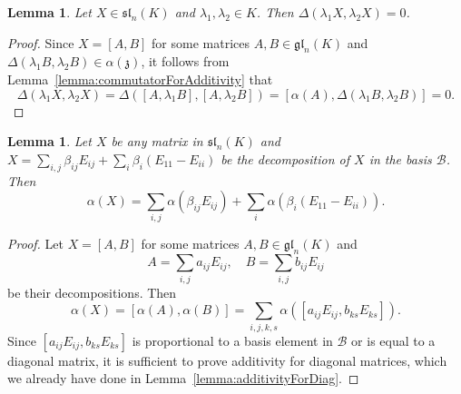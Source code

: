 \documentclass[a4paper,reqno,12pt]{amsart}
\newtheorem{lemma}[proposition]{Lemma}
\theoremstyle{definition}
\theoremstyle{remark}
\def\zzz{\mathfrak{z}}
\def\gl{\mathfrak{gl}}
\def\sl{\mathfrak{sl}}
\begin{document}
	\begin{lemma}\label{lemma:additivityForProportional}
		Let $X \in \sl_n(K)$ and $\lambda_1, \lambda_2 \in K$. Then $\Delta(\lambda_1 X, \lambda_2 X) = 0$.
	\end{lemma}

	\begin{proof}
		Since $X = [A, B]$ for some matrices $A, B \in \gl_n(K)$ and $\Delta(\lambda_1 B, \lambda_2 B) \in \alpha(\zzz)$, it follows from Lemma~\ref{lemma:commutatorForAdditivity} that
		\begin{equation*}
			\Delta(\lambda_1 X, \lambda_2 X) = \Delta([A, \lambda_1 B], [A, \lambda_2 B]) = [\alpha(A), \Delta(\lambda_1 B, \lambda_2 B)] = 0.
		\end{equation*}
	\end{proof}

	\begin{lemma}\label{lemma:basisDecomposition}
		Let $X$ be any matrix in $\sl_n(K)$ and $X = \sum_{i, j} \beta_{ij} E_{ij} + \sum_{i} \beta_{i} (E_{11} - E_{ii})$ be the decomposition of $X$ in the basis $\mathcal{B}$. Then
		\begin{equation*}
			\alpha(X) = \sum_{i, j} \alpha(\beta_{ij} E_{ij}) + \sum_{i} \alpha(\beta_{i} (E_{11} - E_{ii})).
		\end{equation*}
	\end{lemma}

	\begin{proof}
		Let $X = [A, B]$ for some matrices $A, B \in \gl_n(K)$ and
		\begin{equation*}
			A = \sum_{i, j} a_{ij} E_{ij}, \quad B = \sum_{i, j} b_{ij} E_{ij}
		\end{equation*}
		be their decompositions. Then
		\begin{equation*}
			\alpha(X) = [\alpha(A), \alpha(B)] = \sum_{i,j,k,s} \alpha([a_{ij}E_{ij}, b_{ks}E_{ks}]).
		\end{equation*}
		Since $[a_{ij}E_{ij}, b_{ks}E_{ks}]$ is proportional to a basis element in $\mathcal{B}$ or is equal to a diagonal matrix, it is sufficient to prove additivity for diagonal matrices, which we already have done in Lemma~\ref{lemma:additivityForDiag}.
 	\end{proof}
\end{document}
